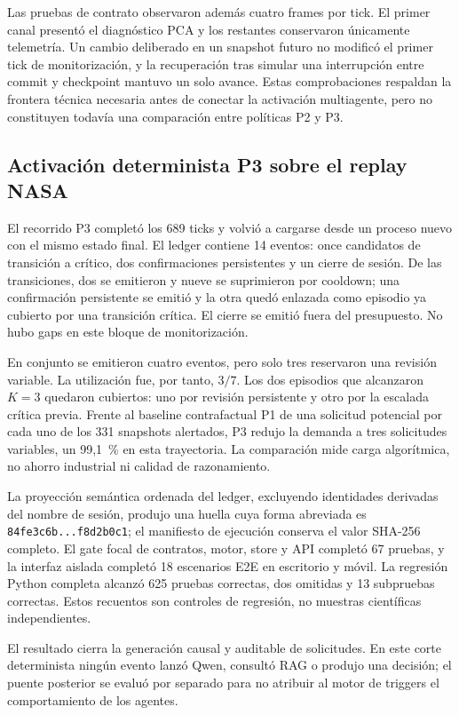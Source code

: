 Las pruebas de contrato observaron además cuatro frames por tick. El primer
canal presentó el diagnóstico PCA y los restantes conservaron únicamente
telemetría. Un cambio deliberado en un snapshot futuro no modificó el primer
tick de monitorización, y la recuperación tras simular una interrupción entre
commit y checkpoint mantuvo un solo avance. Estas comprobaciones respaldan la
frontera técnica necesaria antes de conectar la activación multiagente, pero no
constituyen todavía una comparación entre políticas P2 y P3.

\subsection{Activación determinista P3 sobre el replay NASA}

El recorrido P3 completó los 689 ticks y volvió a cargarse desde un proceso
nuevo con el mismo estado final. El ledger contiene 14 eventos: once candidatos
de transición a crítico, dos confirmaciones persistentes y un cierre de sesión.
De las transiciones, dos se emitieron y nueve se suprimieron por cooldown; una
confirmación persistente se emitió y la otra quedó enlazada como episodio ya
cubierto por una transición crítica. El cierre se emitió fuera del presupuesto.
No hubo gaps en este bloque de monitorización.

En conjunto se emitieron cuatro eventos, pero solo tres reservaron una revisión
variable. La utilización fue, por tanto, $3/7$. Los dos episodios que alcanzaron
$K=3$ quedaron cubiertos: uno por revisión persistente y otro por la escalada
crítica previa. Frente al baseline contrafactual P1 de una solicitud potencial
por cada uno de los 331 snapshots alertados, P3 redujo la demanda a tres
solicitudes variables, un 99,1~\% en esta trayectoria. La comparación mide
carga algorítmica, no ahorro industrial ni calidad de razonamiento.

La proyección semántica ordenada del ledger, excluyendo identidades derivadas
del nombre de sesión, produjo una huella cuya forma abreviada es
\texttt{84fe3c6b...f8d2b0c1}; el manifiesto de ejecución conserva el valor
SHA-256 completo.
El gate focal de contratos, motor, store y API completó 67 pruebas, y la interfaz
aislada completó 18 escenarios E2E en escritorio y móvil. La regresión Python
completa alcanzó 625 pruebas correctas, dos omitidas y 13 subpruebas correctas.
Estos recuentos son controles de regresión, no muestras científicas
independientes.

El resultado cierra la generación causal y auditable de solicitudes. En este
corte determinista ningún evento lanzó Qwen, consultó RAG o produjo una
decisión; el puente posterior se evaluó por separado para no atribuir al motor
de triggers el comportamiento de los agentes.

